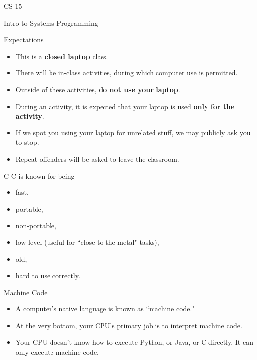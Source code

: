 \documentclass[hyphens,aspectratio=169,dvipsnames]{beamer}
\begin{document}
\begin{frame}[fragile]{CS 15}
    \begin{center} Intro to Systems Programming \end{center}
\end{frame}

\begin{frame}[fragile]{Expectations}
    \begin{itemize}
        \pause \item This is a \textbf{closed laptop} class.
        \pause \item There will be in-class activities, during which computer use is permitted.
        \pause \item Outside of these activities, \textbf{do not use your laptop}.
        \pause \item During an activity, it is expected that your laptop is used \textbf{only for the activity}.
        \pause \item If we spot you using your laptop for unrelated stuff, we may publicly ask you to stop.
        \pause \item Repeat offenders will be asked to leave the classroom.
    \end{itemize}
\end{frame}


\begin{frame}[fragile]{C}
    \pause C is known for being
    \begin{itemize}
        \pause \item fast, %
        \pause \item portable, %
        \pause \item non-portable, %
        \pause \item low-level \pause (useful for ``close-to-the-metal" tasks),
        \pause \item old, %
        \pause \item hard to use correctly.
    \end{itemize}
\end{frame}

\begin{frame}[fragile]{Machine Code}
    \begin{itemize}
        \pause \item A computer's native language is known as ``machine code."
        \pause \item At the very bottom, your CPU's primary job is to interpret machine code.
        \pause \item Your CPU doesn't know how to execute Python, or Java, or C directly. It can only execute machine code.
    \end{itemize}
\end{frame}
\end{document}

